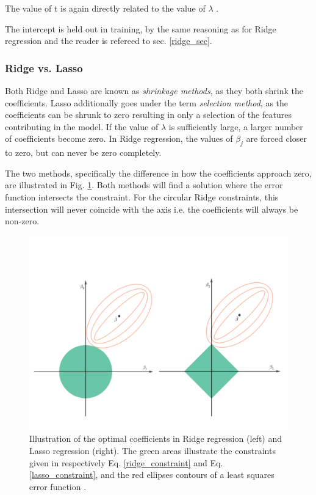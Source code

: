 The value of t is again directly related to the value of $\lambda$ \citep[p. 68]{hastie}.


The intercept is held out in training, by the same reasoning as for Ridge regression and the reader is refereed to sec. \ref{ridge_sec}.


\subsubsection{Ridge vs. Lasso}
Both Ridge and Lasso are known as \textit{shrinkage methods}, as they both shrink the coefficients. Lasso additionally goes under the term \textit{selection method}, as the coefficients can be shrunk to zero resulting in only a selection of the features contributing in the model. 
If the value of $\lambda$ is sufficiently large, a larger number of coefficients become zero. 
In Ridge regression, the values of $\beta_j$ are forced closer to zero, but can never be zero completely. 

The two methods, specifically the difference in how the coefficients approach zero, are illustrated in Fig. \ref{fig:ridge_lasso}. Both methods will find a solution where the error function intersects the constraint. For the circular Ridge constraints, this intersection will never coincide with the axis i.e. the coefficients will always be non-zero. 

\begin{figure}[h!]
    \centering
    \includegraphics[width=1\linewidth]{project_1/figures/ridge-lasso.png}
    \caption{Illustration of the optimal coefficients in Ridge regression (left) and Lasso regression (right). The green areas illustrate the constraints given in respectively Eq. \ref{ridge_constraint} and Eq. \ref{lasso_constraint}, and the red ellipses contours of a least squares error function \cite[Recreated from][p. 71]{hastie}.}
    \label{fig:ridge_lasso}
\end{figure}



